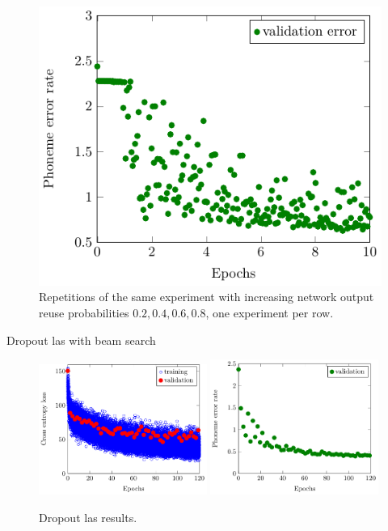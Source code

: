 \documentclass{beamer}
\begin{document}
\begin{frame}
\begin{figure}
	\includegraphics[width=0.24\linewidth]{../tikz/LAS_no_reg_e10_p08_error}
	\caption{Repetitions of the same experiment with increasing network output reuse probabilities $0.2, 0.4, 0.6, 0.8$, one experiment per row.}
	\label{fig:lasGreedy2468}
	\end{figure}
\end{frame}

\begin{frame}{Dropout las with beam search}
	\begin{figure}
	\includegraphics[width=0.49\textwidth]{../tikz/LAS_dropout0805_in00_p06_e120_double_loss}
	\includegraphics[width=0.49\textwidth]{../tikz/LAS_dropout0805_in00_p06_e120_double_error}
	\caption{Dropout las results.}
	\end{figure}
\end{frame}
\end{document}
